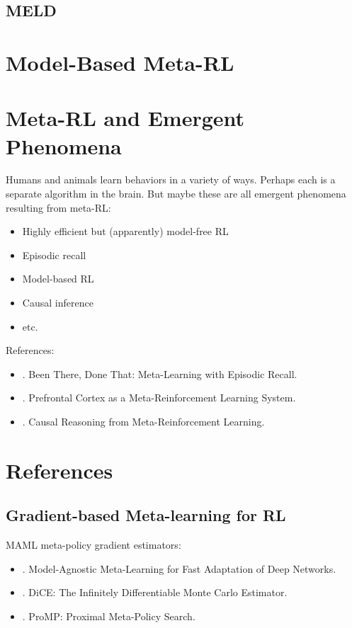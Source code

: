\subsection{MELD}

\section{Model-Based Meta-RL}

\section{Meta-RL and Emergent Phenomena}
Humans and animals learn behaviors in a variety of ways. Perhaps each is a separate algorithm in the brain. But maybe these are all emergent phenomena resulting from meta-\ac{RL}:
\begin{itemize}
	\item Highly efficient but (apparently) model-free RL
	\item Episodic recall
	\item Model-based RL
	\item Causal inference
	\item etc.
\end{itemize}

References:
\begin{itemize}
	\item {}. Been There, Done That: Meta-Learning with Episodic Recall.
	\item {}. Prefrontal Cortex as a Meta-Reinforcement Learning System.
	\item {}. Causal Reasoning from Meta-Reinforcement Learning.
\end{itemize}

\section{References}
\subsection{Gradient-based Meta-learning for RL}

\ac{MAML} meta-policy gradient estimators:
\begin{itemize}
	\item {}. Model-Agnostic Meta-Learning for Fast Adaptation of Deep Networks.
	\item {}. DiCE: The Infinitely Differentiable Monte Carlo Estimator.
	\item {}. ProMP: Proximal Meta-Policy Search.
\end{itemize}

